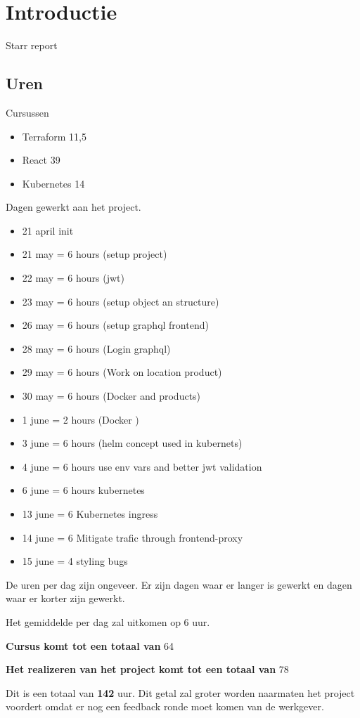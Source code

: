 \section{Introductie}
Starr report

\subsection{Uren}

Cursussen
\begin{itemize}
	\item Terraform 11,5
	\item React 39
	\item Kubernetes 14
\end{itemize}

Dagen gewerkt aan het project.

\begin{itemize}
	\item 21 april init
	\item 21 may = 6 hours (setup project)
	\item 22 may = 6 hours (jwt)
	\item 23 may = 6 hours (setup object an structure)
	\item 26 may = 6 hours (setup graphql frontend)
	\item 28 may = 6 hours (Login graphql)
	\item 29 may = 6 hours (Work on location product)
	\item 30 may = 6 hours (Docker and products)
	\item 1 june = 2 hours (Docker )
	\item 3 june = 6 hours (helm concept used in kubernets)
	\item 4 june = 6 hours use env vars and better jwt validation
	\item 6 june = 6 hours kubernetes
	\item 13 june = 6 Kubernetes ingress
	\item 14 june = 6 Mitigate trafic through frontend-proxy
	\item 15 june = 4 styling bugs
\end{itemize}


De uren per dag zijn ongeveer.
Er zijn dagen waar er langer is gewerkt en dagen waar er korter zijn gewerkt.

Het gemiddelde per dag zal uitkomen op 6 uur.


\textbf{Cursus komt tot een totaal van}  64

\textbf{Het realizeren van het project komt tot een totaal van} 78


Dit is een totaal van \textbf{142} uur.
Dit getal zal groter worden naarmaten het project voordert omdat er nog een feedback ronde moet komen van de werkgever.



